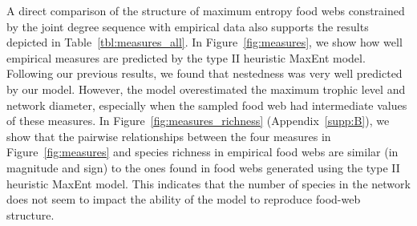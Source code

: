 
A direct comparison of the structure of maximum entropy food webs constrained by
the joint degree sequence with empirical data also supports the results depicted
in Table~\ref{tbl:measures_all}. In Figure~\ref{fig:measures}, we show how well
empirical measures are predicted by the type II heuristic MaxEnt model.
Following our previous results, we found that nestedness was very well predicted
by our model. However, the model overestimated the maximum trophic level and
network diameter, especially when the sampled food web had intermediate values
of these measures. In Figure~\ref{fig:measures_richness} (Appendix~\ref{supp:B}),
we show that the pairwise relationships between the four measures in
Figure~\ref{fig:measures} and species richness in empirical food webs are similar
(in magnitude and sign) to the ones found in food webs generated using the type
II heuristic MaxEnt model. This indicates that the number of species in the
network does not seem to impact the ability of the model to reproduce food-web
structure. 

